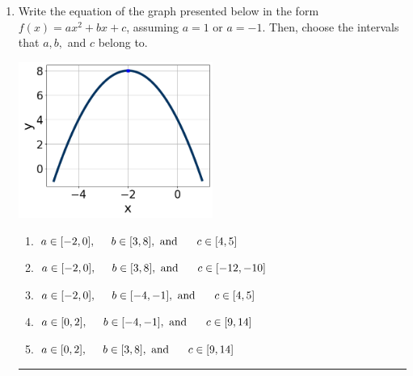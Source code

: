 \documentclass[14pt]{extbook}
\newcommand{\litem}[1]{\item#1\hspace*{-1cm}\rule{\textwidth}{0.4pt}}
\begin{document}
\begin{enumerate}
{\begin{enumerate}[label=\Alph*.]
\end{enumerate} }
\litem{
Write the equation of the graph presented below in the form $f(x)=ax^2+bx+c$, assuming  $a=1$ or $a=-1$. Then, choose the intervals that $a, b,$ and $c$ belong to.
\begin{center}
    \includegraphics[width=0.5\textwidth]{../Figures/quadraticGraphToEquationB.png}
\end{center}
\begin{enumerate}[label=\Alph*.]
\item \( a \in [-2, 0], \hspace*{5mm} b \in [3, 8], \text{ and } \hspace*{5mm} c \in [4, 5] \)
\item \( a \in [-2, 0], \hspace*{5mm} b \in [3, 8], \text{ and } \hspace*{5mm} c \in [-12, -10] \)
\item \( a \in [-2, 0], \hspace*{5mm} b \in [-4, -1], \text{ and } \hspace*{5mm} c \in [4, 5] \)
\item \( a \in [0, 2], \hspace*{5mm} b \in [-4, -1], \text{ and } \hspace*{5mm} c \in [9, 14] \)
\item \( a \in [0, 2], \hspace*{5mm} b \in [3, 8], \text{ and } \hspace*{5mm} c \in [9, 14] \)


\end{enumerate}}
\end{enumerate}
\end{document}
